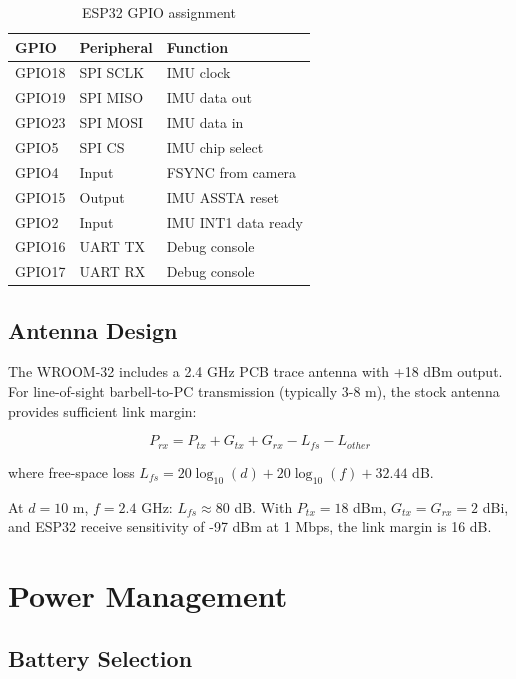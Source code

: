 \begin{table}[h]
    \centering
    \caption{ESP32 GPIO assignment}
    \label{tab:esp32_pins}
    \begin{tabular}{lll}
        \toprule
        \textbf{GPIO} & \textbf{Peripheral} & \textbf{Function} \\
        \midrule
        GPIO18 & SPI SCLK & IMU clock \\
        GPIO19 & SPI MISO & IMU data out \\
        GPIO23 & SPI MOSI & IMU data in \\
        GPIO5  & SPI CS   & IMU chip select \\
        GPIO4  & Input    & FSYNC from camera \\
        GPIO15 & Output   & IMU ASSTA reset \\
        GPIO2  & Input    & IMU INT1 data ready \\
        GPIO16 & UART TX  & Debug console \\
        GPIO17 & UART RX  & Debug console \\
        \bottomrule
    \end{tabular}
\end{table}

\subsection{Antenna Design}

The WROOM-32 includes a 2.4 GHz PCB trace antenna with +18 dBm output. For line-of-sight barbell-to-PC transmission (typically 3-8 m), the stock antenna provides sufficient link margin:

\begin{equation}
    P_{rx} = P_{tx} + G_{tx} + G_{rx} - L_{fs} - L_{other}
\end{equation}

where free-space loss $L_{fs} = 20\log_{10}(d) + 20\log_{10}(f) + 32.44$ dB.

At $d = 10$ m, $f = 2.4$ GHz: $L_{fs} \approx 80$ dB. With $P_{tx} = 18$ dBm, $G_{tx} = G_{rx} = 2$ dBi, and ESP32 receive sensitivity of -97 dBm at 1 Mbps, the link margin is 16 dB.

\section{Power Management}

\subsection{Battery Selection}


